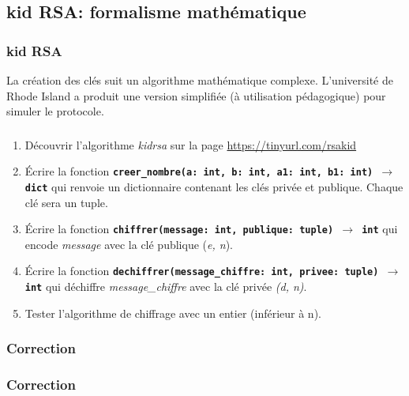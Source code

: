\documentclass[svgnames,11pt]{beamer}
\begin{document}
\subsection{kid RSA: formalisme mathématique}
\begin{frame}
    \frametitle{kid RSA}

    La création des clés suit un algorithme mathématique complexe. L'université de Rhode Island a produit une version simplifiée (à utilisation pédagogique) pour simuler le protocole.

\end{frame}
\begin{frame}
    \frametitle{}

    \begin{activite}
        \begin{enumerate}
            \item Découvrir l'algorithme \emph{kidrsa} sur la page \url{https://tinyurl.com/rsakid}
            \item Écrire la fonction \textbf{\texttt{creer\_nombre(a: int, b: int, a1: int, b1: int) $\rightarrow$ dict}} qui renvoie un dictionnaire contenant les clés privée et publique. Chaque clé sera un tuple.
            \item Écrire la fonction \textbf{\texttt{chiffrer(message: int, publique: tuple) $\rightarrow$ int}} qui encode \emph{message} avec la clé publique (\emph{e, n}).
            \item Écrire la fonction \textbf{\texttt{dechiffrer(message\_chiffre: int, privee: tuple) $\rightarrow$ int}} qui déchiffre \emph{message\_chiffre} avec la clé privée \emph{(d, n)}.
            \item Tester l'algorithme de chiffrage avec un entier (inférieur à n).
        \end{enumerate}
        \end{activite}

\end{frame}
\begin{frame}
    \frametitle{Correction}

    \begin{center}
        
    \end{center}

\end{frame}
\begin{frame}
    \frametitle{Correction}

    \begin{center}
        
    \end{center}

\end{frame}
\end{document}
